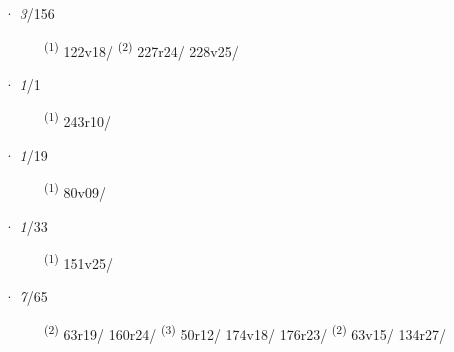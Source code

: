 \ENTRYEND
\noindent{} · \textit{3}/156 \LEMMALINE
\begin{description}
    \item[]  \textsuperscript{(1)} \mbox{122v18/} \textsuperscript{(2)} \mbox{227r24/} \mbox{228v25/}
\end{description}
\ENTRYEND
\noindent{} · \textit{1}/1 \LEMMALINE
\begin{description}
    \item[]  \textsuperscript{(1)} \mbox{243r10/}
\end{description}
\ENTRYEND
\noindent{} · \textit{1}/19 \LEMMALINE
\begin{description}
    \item[]  \textsuperscript{(1)} \mbox{80v09/}
\end{description}
\ENTRYEND
\noindent{} · \textit{1}/33 \LEMMALINE
\begin{description}
    \item[]  \textsuperscript{(1)} \mbox{151v25/}
\end{description}
\ENTRYEND
\noindent{} · \textit{7}/65 \LEMMALINE
\begin{description}
    \item[]  \textsuperscript{(2)} \mbox{63r19/} \mbox{160r24/} \CASEBREAK {} \textsuperscript{(3)} \mbox{50r12/} \mbox{174v18/} \mbox{176r23/} \CASEBREAK {} \textsuperscript{(2)} \mbox{63v15/} \mbox{134r27/}
\end{description}
\ENTRYEND
